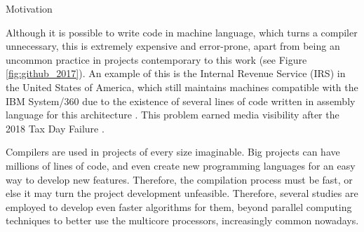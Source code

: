 \begin{section}{Motivation}

Although it is possible to write code in machine language, which turns a compiler
unnecessary, this is extremely expensive and error-prone, apart from being an
uncommon practice in projects contemporary to this work \citep{githuboctoverse}
(see Figure \ref{fig:github_2017}). An example of this is the Internal Revenue
Service (IRS) in the United States of America, which still maintains machines
compatible with the IBM System/360 due to the existence of several lines of
code written in assembly language for this architecture \citep{gao}.  This
problem earned media visibility after the  2018 Tax Day Failure
\citep{tax_failure}.


Compilers are used in projects of every size imaginable. Big projects can have
millions of lines of code, and even create new programming languages for an
easy way to develop new features. Therefore, the compilation process must be
fast, or else it may turn the project development unfeasible.  Therefore,
several studies are employed to develop even faster algorithms for them, beyond
parallel computing techniques to better use the multicore processors,
increasingly common nowadays.


\end{section}
